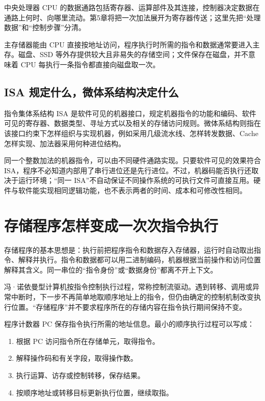 中央处理器 CPU 的数据通路包括寄存器、运算部件及其连接，控制器决定数据在通路上何时、向哪里流动。第5章将把一次加法展开为寄存器传送；这里先把``处理数据''和``控制步骤''分清。

主存储器能由 CPU 直接按地址访问，程序执行时所需的指令和数据通常要进入主存。磁盘、SSD 等外存提供较大且非易失的存储空间；文件保存在磁盘，并不意味着 CPU 每执行一条指令都直接向磁盘取一次。

\subsection{ISA 规定什么，微体系结构决定什么}\label{CO01-03}

指令集体系结构 ISA 是软件可见的机器接口，规定机器指令的功能和编码、软件可见的寄存器、数据类型、寻址方式以及相关的存储访问规则。微体系结构则指在该接口约束下怎样组织与实现机器，例如采用几级流水线、怎样转发数据、Cache 怎样实现、加法器采用何种进位结构。

同一个整数加法的机器指令，可以由不同硬件通路实现。只要软件可见的效果符合 ISA，程序不必知道内部用了串行进位还是先行进位。不过，机器码能否执行还取决于运行环境；``同一 ISA''不自动保证不同操作系统的可执行文件可直接互用。硬件与软件能实现相同逻辑功能，也不表示两者的时间、成本和可修改性相同。

\section{存储程序怎样变成一次次指令执行}\label{CO01-04}

存储程序的基本思想是：执行前把程序指令和数据存入存储器，运行时自动取出指令、解释并执行。指令和数据都可以用二进制编码，机器根据当前操作和访问位置解释其含义。同一串位的``指令身份''或``数据身份''都离不开上下文。

冯·诺依曼型计算机按指令控制执行过程，常称控制流驱动。遇到转移、调用或异常中断时，下一步不再简单地取顺序地址上的指令，但仍由确定的控制机制改变执行位置。``存储程序''并不要求程序所在的存储内容在指令执行期间保持不变。

程序计数器 PC 保存指令执行所需的地址信息。最小的顺序执行过程可以写成：

\begin{enumerate}
\def\labelenumi{\arabic{enumi}.}
\tightlist
\item
  根据 PC 访问指令所在存储单元，取得指令。
\item
  解释操作码和有关字段，取得操作数。
\item
  执行运算、访存或控制转移，保存结果。
\item
  按顺序地址或转移目标更新执行位置，继续取指。
\end{enumerate}

